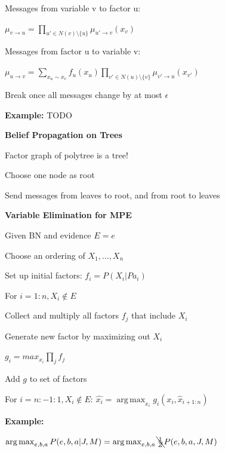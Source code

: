 \documentclass[a4paper, 11pt, landscape]{article}
\DeclareMathOperator*{\argmax}{arg\,max}
\begin{document}
\begin{multicols*}{3}
\begin{compactitem}
\begin{compactenum}
			Messages from variable v to factor u: 
			
			$\mu_{v \rightarrow u} = \prod_{u' \in N(v) \setminus \{u\}} \mu_{u' \rightarrow v}(x_{v})$ 
			
			Messages from factor u to variable v:
			
			$\mu_{u \rightarrow v} = \sum_{x_u \sim x_v} f_u(x_u) \prod_{v' \in N(u) \setminus \{v\}} \mu_{v' \rightarrow u}(x_{v'})$ 

			\item Break once all messages change by at most $\epsilon$
		\end{compactenum}
	\end{compactitem}

	\textbf{Example:} TODO

	\textbf{Belief Propagation on Trees}
	\begin{compactitem}
		\item Factor graph of polytree is a tree!
		\item Choose one node as root
		\item Send messages from leaves to root, and from root to leaves
	\end{compactitem}
   
\textbf{Variable Elimination for MPE}	
	\begin{compactitem}
	\item Given BN and evidence $E=e$
	\item Choose an ordering of $X_1, ...,X_n$
	\item Set up initial factors: $f_i = P(X_i | Pa_i)$
	\item For $i=1:n, X_i \notin  E$
  	\begin{compactenum}
  	\item Collect and multiply all factors $f_j$ that include $X_i$   
  	\item Generate new factor by maximizing out $X_i$
  	
	$g_i = max_{x_i} \prod_{j} f_j$
  	\item Add $g$ to set of factors
  	\end{compactenum}
	\item For $i=n:-1:1, X_i \notin  E$:  $\hat{x_i} = \argmax_{x_i} g_i(x_i, \hat{x}_{i+1:n})$
\end{compactitem}

\textbf{Example: }

$\argmax_{e , b, a} P(e,b,a| J, M) = \argmax_{e , b, a} \bcancel{\frac{1}{Z}} P(e,b,a, J,M)$


\end{multicols*}
\end{document}
